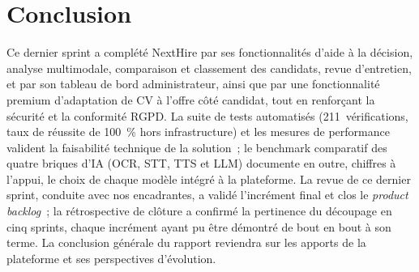 \section{Conclusion}

Ce dernier sprint a complété NextHire par ses fonctionnalités d'aide à la décision, analyse multimodale, comparaison et classement des candidats, revue d'entretien, et par son tableau de bord administrateur, ainsi que par une fonctionnalité premium d'adaptation de CV à l'offre côté candidat, tout en renforçant la sécurité et la conformité RGPD. La suite de tests automatisés (211~vérifications, taux de réussite de 100~\% hors infrastructure) et les mesures de performance valident la faisabilité technique de la solution~; le benchmark comparatif des quatre briques d'IA (OCR, STT, TTS et LLM) documente en outre, chiffres à l'appui, le choix de chaque modèle intégré à la plateforme. La revue de ce dernier sprint, conduite avec nos encadrantes, a validé l'incrément final et clos le \textit{product backlog}~; la rétrospective de clôture a confirmé la pertinence du découpage en cinq sprints, chaque incrément ayant pu être démontré de bout en bout à son terme. La conclusion générale du rapport reviendra sur les apports de la plateforme et ses perspectives d'évolution.
